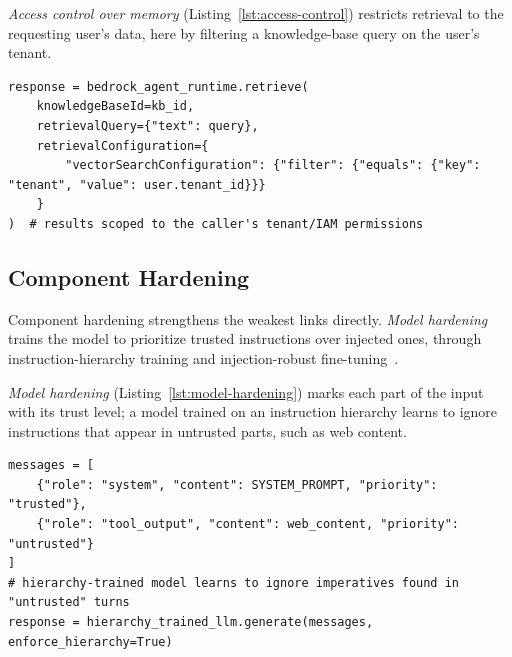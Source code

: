 \emph{Access control over memory} (Listing~\ref{lst:access-control}) restricts retrieval to the requesting user's data, here by filtering a knowledge-base query on the user's tenant.

\noindent\begin{minipage}{\linewidth}
\begin{lstlisting}[caption={Access control over memory and external resources, as implemented for agent knowledge bases in Amazon Bedrock~\cite{bedrock}.}, label={lst:access-control}]
response = bedrock_agent_runtime.retrieve(
    knowledgeBaseId=kb_id,
    retrievalQuery={"text": query},
    retrievalConfiguration={
        "vectorSearchConfiguration": {"filter": {"equals": {"key": "tenant", "value": user.tenant_id}}}
    }
)  # results scoped to the caller's tenant/IAM permissions
\end{lstlisting}
\end{minipage}


\subsection{Component Hardening}

Component hardening strengthens the weakest links directly. \emph{Model hardening} trains the model to prioritize trusted instructions over injected ones, through instruction-hierarchy training and injection-robust fine-tuning~\cite{wallace2024hierarchy,chen2025secalign,chen2025struq}.

\emph{Model hardening} (Listing~\ref{lst:model-hardening}) marks each part of the input with its trust level; a model trained on an instruction hierarchy learns to ignore instructions that appear in untrusted parts, such as web content.

\noindent\begin{minipage}{\linewidth}
\begin{lstlisting}[caption={Model hardening: instruction-hierarchy training so the model privileges system instructions over injected content~\cite{wallace2024hierarchy}.}, label={lst:model-hardening}]
messages = [
    {"role": "system", "content": SYSTEM_PROMPT, "priority": "trusted"},
    {"role": "tool_output", "content": web_content, "priority": "untrusted"}
]
# hierarchy-trained model learns to ignore imperatives found in "untrusted" turns
response = hierarchy_trained_llm.generate(messages, enforce_hierarchy=True)
\end{lstlisting}
\end{minipage}

